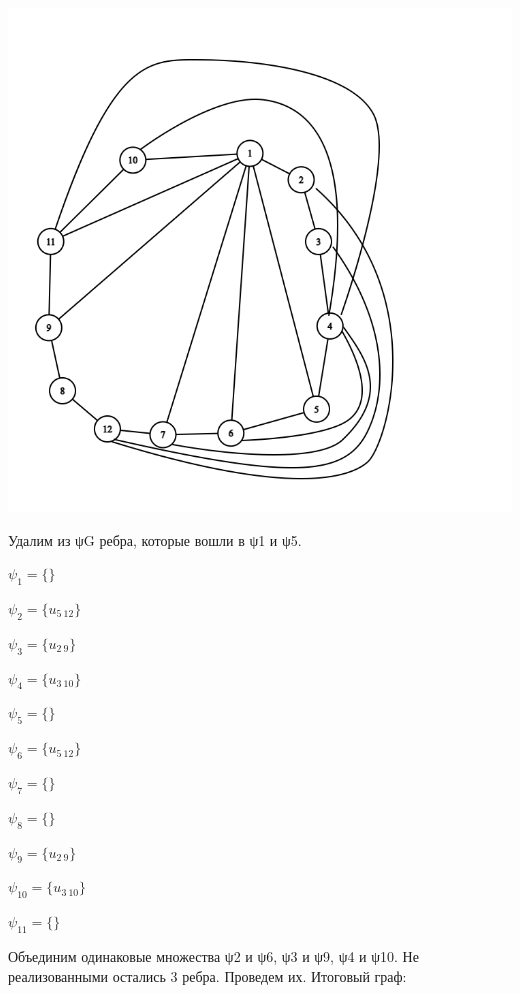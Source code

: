 \documentclass{article}
\begin{document}
\begin{center}
  \includegraphics[scale=0.5]{graph.png}
\end{center}

Удалим из ψG ребра, которые вошли в ψ1 и ψ5.

$\psi_{1} = \{\}$

$\psi_{2} = \{u_{5\ 12}\}$

$\psi_{3} = \{u_{2\ 9}\}$

$\psi_{4} = \{u_{3\ 10}\}$

$\psi_{5} = \{\}$

$\psi_{6} = \{u_{5\ 12}\}$

$\psi_{7} = \{\}$

$\psi_{8} = \{\}$

$\psi_{9} = \{u_{2\ 9}\}$

$\psi_{10} = \{u_{3\ 10}\}$

$\psi_{11} = \{\}$

Объединим одинаковые множества ψ2 и ψ6, ψ3 и ψ9, ψ4 и ψ10.
Не реализованными остались 3 ребра. Проведем их. Итоговый граф:
\end{document}
